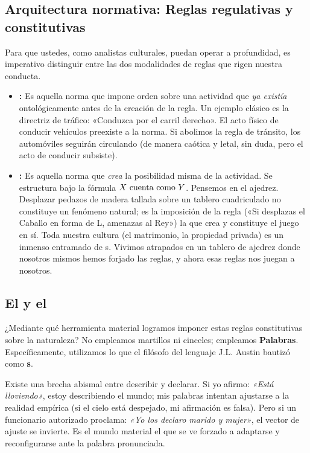 \subsection{Arquitectura normativa: Reglas regulativas y constitutivas}

Para que ustedes, como analistas culturales, puedan operar a profundidad, es imperativo distinguir entre las dos modalidades de reglas que rigen nuestra conducta.

\begin{itemize}
    \item \textbf{\ReglaRegulativa:} Es aquella norma que impone orden sobre una actividad que \textit{ya existía} ontológicamente antes de la creación de la regla. Un ejemplo clásico es la directriz de tráfico: «Conduzca por el carril derecho». El acto físico de conducir vehículos preexiste a la norma. Si abolimos la regla de tránsito, los automóviles seguirán circulando (de manera caótica y letal, sin duda, pero el acto de conducir subsiste).
    \item \textbf{\ReglaConstitutiva:} Es aquella norma que \textit{crea} la posibilidad misma de la actividad. Se estructura bajo la fórmula $X \text{ cuenta como } Y$. Pensemos en el ajedrez. Desplazar pedazos de madera tallada sobre un tablero cuadriculado no constituye un fenómeno natural; es la imposición de la regla («Si desplazas el Caballo en forma de L, amenazas al Rey») la que crea y constituye el juego en sí. Toda nuestra cultura (el matrimonio, la propiedad privada) es un inmenso entramado de \ReglaConstitutiva{}s. Vivimos atrapados en un tablero de ajedrez donde nosotros mismos hemos forjado las reglas, y ahora esas reglas nos juegan a nosotros.
\end{itemize}

\subsection{El \ActoDeclarativo{} y el \EfectoTinkerbell}

¿Mediante qué herramienta material logramos imponer estas reglas constitutivas sobre la naturaleza? No empleamos martillos ni cinceles; empleamos \textbf{Palabras}. Específicamente, utilizamos lo que el filósofo del lenguaje J.L. Austin bautizó como \textbf{\ActoDeclarativo{}s}.

Existe una brecha abismal entre describir y declarar. Si yo afirmo: \textit{«Está lloviendo»}, estoy describiendo el mundo; mis palabras intentan ajustarse a la realidad empírica (si el cielo está despejado, mi afirmación es falsa). Pero si un funcionario autorizado proclama: \textit{«Yo los declaro marido y mujer»}, el vector de ajuste se invierte. Es el mundo material el que se ve forzado a adaptarse y reconfigurarse ante la palabra pronunciada. 

